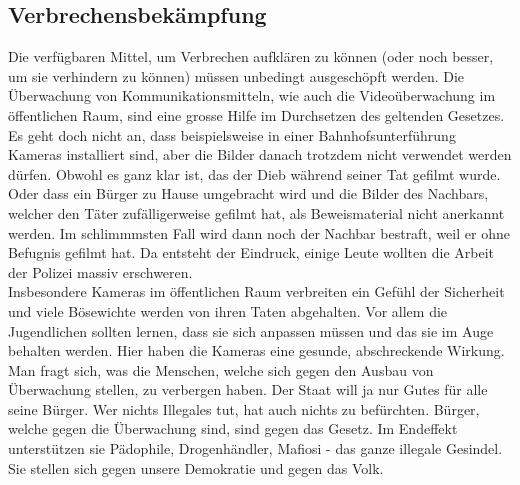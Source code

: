 \subsection{Verbrechensbekämpfung}
Die verfügbaren Mittel, um Verbrechen 
aufklären zu können (oder noch besser, um sie verhindern zu können) 
müssen unbedingt ausgeschöpft werden. Die Überwachung von 
Kommunikationsmitteln, wie auch die Videoüberwachung im öffentlichen 
Raum, sind eine grosse Hilfe im Durchsetzen des geltenden Gesetzes. Es 
geht doch nicht an, dass beispielsweise in einer 
Bahnhofsunterführung Kameras installiert sind, aber die Bilder danach 
trotzdem nicht verwendet werden dürfen. Obwohl es ganz klar ist, das 
der Dieb während seiner Tat gefilmt wurde. Oder dass ein B\"urger zu Hause 
umgebracht wird und die Bilder des Nachbars, welcher den Täter 
zufälligerweise gefilmt hat, als Beweismaterial nicht anerkannt werden. 
Im schlimmmsten Fall wird dann noch der Nachbar bestraft, weil er ohne 
Befugnis gefilmt hat. Da entsteht der Eindruck, einige Leute wollten 
die Arbeit der Polizei massiv erschweren.\\
Insbesondere Kameras im öffentlichen Raum verbreiten
ein Gefühl der Sicherheit und viele Bösewichte werden von ihren 
Taten abgehalten. Vor allem die Jugendlichen sollten lernen, dass sie 
sich anpassen müssen und das sie im Auge behalten werden. Hier haben die 
Kameras eine gesunde, abschreckende Wirkung.\\
Man fragt sich, was die Menschen, welche sich gegen den Ausbau von 
Überwachung stellen, zu verbergen haben. Der Staat will ja nur Gutes 
für alle seine B\"urger. Wer nichts Illegales tut, hat auch nichts zu befürchten. 
Bürger, welche gegen die Überwachung sind, sind gegen das Gesetz. Im 
Endeffekt unterstützen sie Pädophile, Drogenhändler, Mafiosi - das 
ganze illegale Gesindel. Sie stellen sich gegen unsere Demokratie und 
gegen das Volk.

